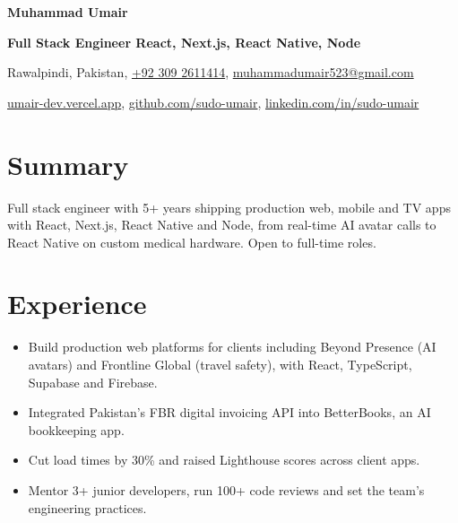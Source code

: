 {\fontsize{24}{26}\selectfont\bfseries Muhammad Umair}\par
\vspace{2pt}
{\color{accent}\bfseries Full Stack Engineer \textbar{} React, Next.js, React Native, Node}\par
\vspace{3pt}
{\small\color{muted}%
Rawalpindi, Pakistan\sep
\href{tel:+923092611414}{+92 309 2611414}\sep
\href{mailto:muhammadumair523@gmail.com}{muhammadumair523@gmail.com}\par
\href{https://umair-dev.vercel.app}{umair-dev.vercel.app}\sep
\href{https://github.com/sudo-umair}{github.com/sudo-umair}\sep
\href{https://www.linkedin.com/in/sudo-umair/}{linkedin.com/in/sudo-umair}\par}

\section{Summary}
Full stack engineer with 5+ years shipping production web, mobile and TV apps with React, Next.js, React Native and Node,
from real-time AI avatar calls to React Native on custom medical hardware. Open to full-time roles.

\section{Experience}
\begin{itemize}
  \item Build production web platforms for clients including Beyond Presence (AI avatars) and Frontline Global (travel safety), with React, TypeScript, Supabase and Firebase.
  \item Integrated Pakistan's FBR digital invoicing API into BetterBooks, an AI bookkeeping app.
  \item Cut load times by 30\% and raised Lighthouse scores across client apps.
  \item Mentor 3+ junior developers, run 100+ code reviews and set the team's engineering practices.
\end{itemize}

